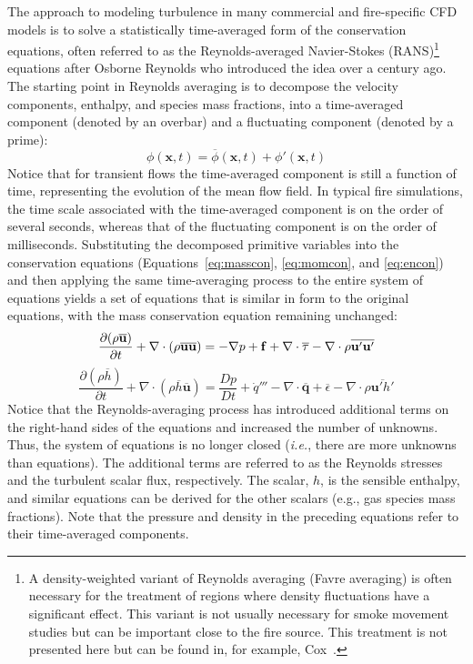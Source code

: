 \documentclass[graybox]{svmult}
\begin{document}
The approach to modeling turbulence in many commercial and fire-specific CFD models is to solve a statistically time-averaged form of the conservation equations, often referred to as the Reynolds-averaged Navier-Stokes (RANS)\footnote{A density-weighted variant of Reynolds averaging (Favre averaging) is often necessary for the treatment of regions where density fluctuations have a significant effect. This variant is not usually necessary for smoke movement studies but can be important close to the fire source. This treatment is not presented here but can be found in, for example, Cox~\cite{Cox:1995}.} equations after Osborne Reynolds who introduced the idea over a century ago. The starting point in Reynolds averaging is to decompose the velocity components, enthalpy, and species mass fractions, into a time-averaged component (denoted by an overbar) and a fluctuating component (denoted by a prime):
\begin{equation}
\phi(\mathbf{x},t) = \overline{\phi}(\mathbf{x},t) + \phi'(\mathbf{x},t)
\label{eq:phidef}
\end{equation}
Notice that for transient flows the time-averaged component is still a function of time, representing the evolution of the mean flow field. In typical fire simulations, the time scale associated with the time-averaged component is on the order of several seconds, whereas that of the fluctuating component is on the order of milliseconds. Substituting the decomposed primitive variables into the conservation equations (Equations~\ref{eq:masscon}, \ref{eq:momcon}, and \ref{eq:encon}) and then applying the same time-averaging process to the entire system of equations yields a set of equations that is similar in form to the original equations, with the mass conservation equation remaining unchanged:
\begin{equation}
\frac{\partial (\rho \overline{\mathbf{u}})}{\partial t} + \nabla \cdot (\rho \overline{\mathbf{u}} \overline{\mathbf{u}}) = -\nabla p + \mathbf{f} + \nabla \cdot \overline{\tens{\tau}}
- \nabla \cdot \rho \overline{ \mathbf{u}' \mathbf{u}' }
\label{eq:filmomcon}
\end{equation}
\begin{equation}
\frac{\partial (\rho \overline{h})}{\partial t} + \nabla \cdot (\rho \overline{h} \overline{\mathbf{u}}) = \frac{Dp}{Dt} + \dot{q}''' - \nabla \cdot \overline{\mathbf{q}}
+ \overline{\epsilon} - \nabla \cdot \rho \overline{ \mathbf{u}' h' }
\label{eq:filencon}
\end{equation}
Notice that the Reynolds-averaging process has introduced additional terms on the right-hand sides of the equations and increased the number of unknowns. Thus, the system of equations is no longer closed ({\em i.e.}, there are more unknowns than equations). The additional terms are referred to as the Reynolds stresses and the turbulent scalar flux, respectively. The scalar, $h$, is the sensible enthalpy, and similar equations can be derived for the other scalars ({e.g.}, gas species mass fractions). Note that the pressure and density in the preceding equations refer to their time-averaged components.
\end{document}
